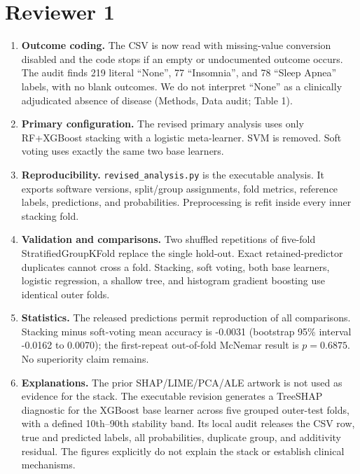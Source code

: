 \documentclass[11pt]{article}
\begin{document}
\section*{Reviewer 1}
\begin{enumerate}
\item \textbf{Outcome coding.} The CSV is now read with missing-value conversion disabled and the code stops if an empty or undocumented outcome occurs. The audit finds 219 literal ``None'', 77 ``Insomnia'', and 78 ``Sleep Apnea'' labels, with no blank outcomes. We do not interpret ``None'' as a clinically adjudicated absence of disease (Methods, Data audit; Table 1).
\item \textbf{Primary configuration.} The revised primary analysis uses only RF+XGBoost stacking with a logistic meta-learner. SVM is removed. Soft voting uses exactly the same two base learners.
\item \textbf{Reproducibility.} \texttt{revised\_analysis.py} is the executable analysis. It exports software versions, split/group assignments, fold metrics, reference labels, predictions, and probabilities. Preprocessing is refit inside every inner stacking fold.
\item \textbf{Validation and comparisons.} Two shuffled repetitions of five-fold StratifiedGroupKFold replace the single hold-out. Exact retained-predictor duplicates cannot cross a fold. Stacking, soft voting, both base learners, logistic regression, a shallow tree, and histogram gradient boosting use identical outer folds.
\item \textbf{Statistics.} The released predictions permit reproduction of all comparisons. Stacking minus soft-voting mean accuracy is -0.0031 (bootstrap 95\% interval -0.0162 to 0.0070); the first-repeat out-of-fold McNemar result is $p=0.6875$. No superiority claim remains.
\item \textbf{Explanations.} The prior SHAP/LIME/PCA/ALE artwork is not used as evidence for the stack. The executable revision generates a TreeSHAP diagnostic for the XGBoost base learner across five grouped outer-test folds, with a defined 10th--90th stability band. Its local audit releases the CSV row, true and predicted labels, all probabilities, duplicate group, and additivity residual. The figures explicitly do not explain the stack or establish clinical mechanisms.
\end{enumerate}
\end{document}
